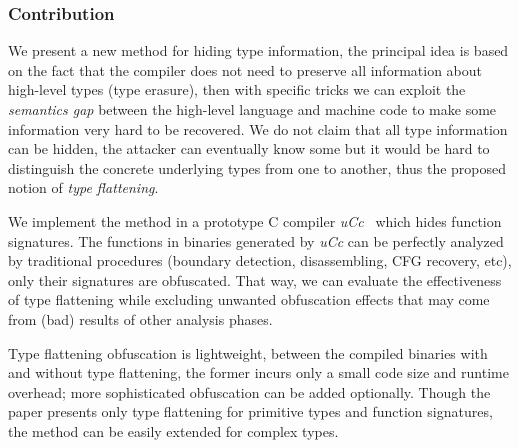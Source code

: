 \documentclass[compsoc,conference,a4paper,10pt,times]{IEEEtran}
\begin{document}
\subsubsection*{Contribution}
We present a new method for hiding type information, the principal idea is based on the fact that the compiler does not need to preserve all information
about high-level types (type erasure), then with specific tricks we can exploit the \emph{semantics gap} between
the high-level language and machine code to make some information very hard
to be recovered. We do not claim that all type information can be hidden, the attacker can
eventually know some but it would be hard to distinguish the concrete underlying types from one to another,
thus the proposed notion of \emph{type flattening}.

We implement the method in a prototype C compiler \emph{uCc}~\cite{ta_ucc_nodate} which hides
function signatures. The functions in binaries generated by \emph{uCc} can be
perfectly analyzed by traditional procedures (boundary detection, disassembling, CFG recovery, etc),
only their signatures are obfuscated. That way, we can evaluate the effectiveness of type
flattening while excluding unwanted obfuscation effects that may come from (bad) results
of other analysis phases.

Type flattening obfuscation is lightweight, between the compiled binaries with and without type
flattening, the former incurs only a small code size and runtime overhead; more sophisticated obfuscation
can be added optionally. Though the paper presents only type flattening for primitive types and function
signatures, the method can be easily extended for complex types.
\end{document}
